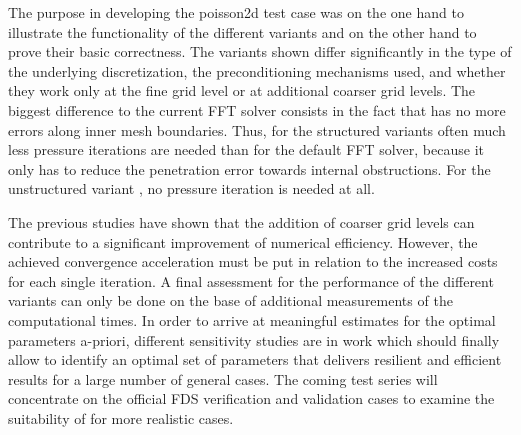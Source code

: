 The purpose in developing the {\ct poisson2d} test case was on the one hand to illustrate the functionality of the different \scarc{} variants and on the other hand to prove their basic correctness. The variants shown differ significantly in the type of the underlying discretization, the preconditioning mechanisms used, and whether they work only at the fine grid level or at additional coarser grid levels. 
%
The biggest difference to the current FFT solver consists in the fact that \scarc{} has no more errors along inner mesh boundaries. Thus, for the structured \scarc{} variants often much less pressure iterations are needed than for the default FFT solver, because it only has to reduce the penetration error towards internal obstructions. For the unstructured variant \uscarc{}, no pressure iteration is needed at all.

The previous studies have shown that the addition of coarser grid levels can contribute to a significant improvement of numerical efficiency. However, the achieved convergence acceleration must be put in relation to the increased costs for each single iteration.
A final assessment for the performance of the different variants can only be done on the base of additional measurements of the computational times. 
In order to arrive at meaningful estimates for the optimal parameters a-priori, different sensitivity studies are in work which should finally allow to identify an optimal set of parameters that delivers resilient and efficient results for a large number of general cases.
The coming test series will concentrate on the official FDS verification and validation cases to examine the suitability of \scarc{} for more realistic cases.
